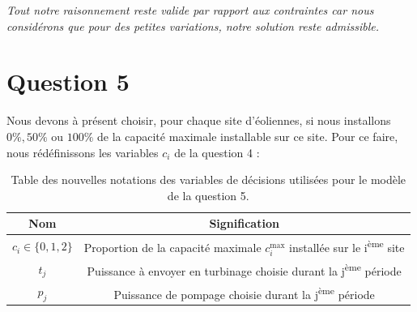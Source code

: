 \documentclass{article}
\begin{document}
\noindent \textit{Tout notre raisonnement reste valide par rapport aux contraintes car nous considérons que pour des petites variations, notre solution reste admissible.}

\newpage
\section*{Question 5}
Nous devons à présent choisir, pour chaque site d'éoliennes, si nous installons $0\%, 50\%$ ou $100\%$ de la capacité maximale installable sur ce site.
Pour ce faire, nous rédéfinissons les variables $c_i$ de la question 4 :

\begin{table}[h!]
    \centering
    \renewcommand{\arraystretch}{1.5}%
    \begin{tabular}{|c || c |} 
        \hline
        Nom & Signification\\
        \hline\hline
        $c_{i} \in \{ 0, 1, 2 \}$ & Proportion de la capacité maximale $c_i^\mathrm{max}$ installée sur le i\textsuperscript{ème} site\\
        $t_j$ & Puissance à envoyer en turbinage choisie durant la j\textsuperscript{ème} période\\
        $p_j$ & Puissance de pompage choisie durant la j\textsuperscript{ème} période\\
        \hline
    \end{tabular}
    \caption{Table des nouvelles notations des variables de décisions utilisées pour le modèle de la question 5.}
    \label{table:notations_variables_5}
\end{table} 
\end{document}
